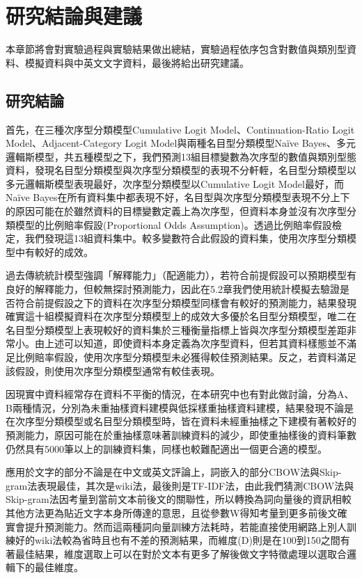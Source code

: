 %
%
\fontsize{12}{22pt}\selectfont
\cleardoublepage
\thispagestyle{empty}
\setlength{\parindent}{2em}
\chapter{研究結論與建議}

	本章節將會對實驗過程與實驗結果做出總結，實驗過程依序包含對數值與類別型資料、模擬資料與中英文文字資料，最後將給出研究建議。
	
\section{研究結論}

	首先，在三種次序型分類模型Cumulative Logit Model、Continuation-Ratio Logit Model、Adjacent-Category Logit Model與兩種名目型分類模型Naïve Bayes、多元邏輯斯模型，共五種模型之下，我們預測13組目標變數為次序型的數值與類別型態資料，發現名目型分類模型與次序型分類模型的表現不分軒輊，名目型分類模型以多元邏輯斯模型表現最好，次序型分類模型以Cumulative Logit Model最好，而Naïve Bayes在所有資料集中都表現不好，名目型與次序型分類模型表現不分上下的原因可能在於雖然資料的目標變數定義上為次序型，但資料本身並沒有次序型分類模型的比例賠率假設(Proportional Odds Assumption)。透過比例賠率假設檢定，我們發現這13組資料集中。較多變數符合此假設的資料集，使用次序型分類模型中有較好的成效。
	
	過去傳統統計模型強調「解釋能力」（配適能力），若符合前提假設可以預期模型有良好的解釋能力，但較無探討預測能力，因此在5.2章我們使用統計模擬去驗證是否符合前提假設之下的資料在次序型分類模型同樣會有較好的預測能力，結果發現確實這十組模擬資料在次序型分類模型上的成效大多優於名目型分類模型，唯二在名目型分類模型上表現較好的資料集於三種衡量指標上皆與次序型分類模型差距非常小。由上述可以知道，即使資料本身定義為次序型資料，但若其資料樣態並不滿足比例賠率假設，使用次序型分類模型未必獲得較佳預測結果。反之，若資料滿足該假設，則使用次序型分類模型通常有較佳表現。
	
	因現實中資料經常存在資料不平衡的情況，在本研究中也有對此做討論，分為A、B兩種情況，分別為未重抽樣資料建模與低採樣重抽樣資料建模，結果發現不論是在次序型分類模型或名目型分類模型時，皆在資料未經重抽樣之下建模有著較好的預測能力，原因可能在於重抽樣意味著訓練資料的減少，即使重抽樣後的資料筆數仍然具有5000筆以上的訓練資料集，同樣也較難配適出一個更合適的模型。

	應用於文字的部分不論是在中文或英文評論上，詞嵌入的部分CBOW法與Skip-gram法表現最佳，其次是wiki法，最後則是TF-IDF法，由此我們猜測CBOW法與Skip-gram法因考量到當前文本前後文的關聯性，所以轉換為詞向量後的資訊相較其他方法更為貼近文字本身所傳達的意思，且從參數W得知考量到更多前後文確實會提升預測能力。然而這兩種詞向量訓練方法耗時，若能直接使用網路上別人訓練好的wiki法較為省時且也有不差的預測結果，而維度(D)則是在100到150之間有著最佳結果，維度選取上可以在對於文本有更多了解後做文字特徵處理以選取合邏輯下的最佳維度。
	
